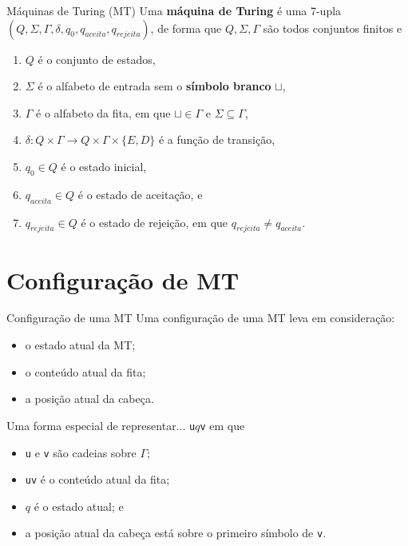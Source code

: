\documentclass[xcolor=dvipsnames,table]{beamer}
\begin{document}
	\begin{frame}{Máquinas de Turing (MT)}
		Uma {\bf máquina de Turing} é uma 7-upla $(Q, \Sigma, \Gamma, \delta, q_0, q_{aceita}, q_{rejeita})$, de forma que $Q, \Sigma, \Gamma$ são todos conjuntos finitos e
		
		\begin{enumerate}
			\item $Q$ é o conjunto de estados,
			\item $\Sigma$ é o alfabeto de entrada sem o {\bf símbolo branco} $\sqcup$,
			\item $\Gamma$ é o alfabeto da fita, em que $\sqcup \in \Gamma$ e $\Sigma \subseteq \Gamma$,
			\item $\delta : Q \times \Gamma \rightarrow Q \times \Gamma \times \{E, D\}$ é a função de transição,
			\item $q_0 \in Q$ é o estado inicial,
			\item $q_{aceita} \in Q$ é o estado de aceitação, e
			\item $q_{rejeita} \in Q$ é o estado de rejeição, em que $q_{rejeita} \not= q_{aceita}$.
		\end{enumerate}
	\end{frame}
	
	\section{Configuração de MT}
	\begin{frame}{Configuração de uma MT}
		Uma configuração de uma MT leva em consideração:
		\begin{itemize}
			\item o estado atual da MT;
			\item o conteúdo atual da fita;
			\item a posição atual da cabeça.
		\end{itemize}\pause
		\begin{block}{Uma forma especial de representar...}
			{\tt u}$q${\tt v} em que
			\begin{itemize}
				\item {\tt u} e {\tt v} são cadeias sobre $\Gamma$;
				\item {\tt uv} é o conteúdo atual da fita;
				\item $q$ é o estado atual; e
				\item a posição atual da cabeça está sobre o primeiro símbolo de {\tt v}.
			\end{itemize}
		\end{block}
	\end{frame}	
	
\end{document}
